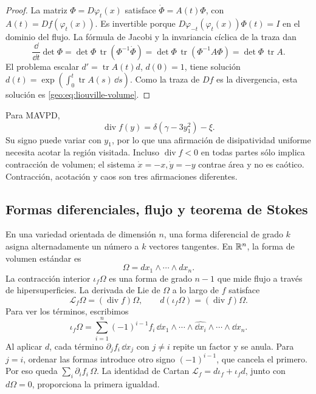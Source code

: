 \begin{proof}
La matriz \(\Phi=D\varphi_t(x)\) satisface
\(\dot\Phi=A(t)\Phi\), con \(A(t)=Df(\varphi_t(x))\). Es invertible
porque \(D\varphi_{-t}(\varphi_t(x))\Phi(t)=I\) en el dominio del flujo.
La fórmula de Jacobi y la invariancia cíclica de la traza dan
\[
 \frac{\dd}{\dd t}\det\Phi
 =\det\Phi\,\operatorname{tr}(\Phi^{-1}\dot\Phi)
 =\det\Phi\,\operatorname{tr}(\Phi^{-1}A\Phi)
 =\det\Phi\,\operatorname{tr}A.
\]
El problema escalar \(d'=\operatorname{tr}A(t)d\), \(d(0)=1\), tiene
solución \(d(t)=\exp(\int_0^t\operatorname{tr}A(s)\,\dd s)\).
Como la traza de \(Df\) es la divergencia, esta solución es
\eqref{geo:eq:liouville-volume}.
\end{proof}

Para MAVPD,
\begin{equation}
 \operatorname{div}f(y)=\delta(\gamma-3y_1^2)-\xi.
 \label{geo:eq:mavpd-divergence}
\end{equation}
Su signo puede variar con \(y_1\), por lo que una afirmación de disipatividad
uniforme necesita acotar la región visitada. Incluso
\(\operatorname{div}f<0\) en todas partes sólo implica contracción de volumen;
el sistema \(\dot x=-x,\dot y=-y\) contrae área y no es caótico. Contracción,
acotación y caos son tres afirmaciones diferentes.

\subsection{Formas diferenciales, flujo y teorema de Stokes}

En una variedad orientada de dimensión \(n\), una forma diferencial de grado
\(k\) asigna alternadamente un número a \(k\) vectores tangentes. En
\(\mathbb{R}^n\), la forma de volumen estándar es
\begin{equation}
 \Omega=dx_1\wedge\cdots\wedge dx_n.
 \label{geo:eq:volume-form}
\end{equation}
La contracción interior \(\iota_f\Omega\) es una forma de grado \(n-1\) que
mide flujo a través de hipersuperficies. La derivada de Lie de \(\Omega\) a lo
largo de \(f\) satisface
\begin{equation}
 \mathcal L_f\Omega=(\operatorname{div}f)\Omega,\qquad
 d(\iota_f\Omega)=(\operatorname{div}f)\Omega.
 \label{geo:eq:cartan-divergence}
\end{equation}
Para ver los términos, escribimos
\[
 \iota_f\Omega=\sum_{i=1}^n(-1)^{i-1}f_i\,
 \dd x_1\wedge\cdots\wedge\widehat{\dd x_i}\wedge\cdots\wedge\dd x_n.
\]
Al aplicar \(d\), cada término \(\partial_jf_i\,\dd x_j\) con
\(j\ne i\) repite un factor y se anula. Para \(j=i\), ordenar las
formas introduce otro signo \((-1)^{i-1}\), que cancela el primero.
Por eso queda \(\sum_i\partial_if_i\,\Omega\).
La identidad de Cartan \(\mathcal L_f=d\iota_f+\iota_fd\), junto con
\(d\Omega=0\), proporciona la primera igualdad.

